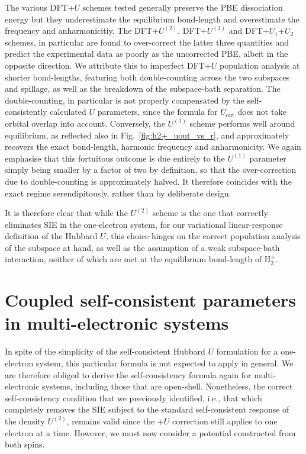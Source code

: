 %
The various DFT+$U$ schemes tested
generally preserve the PBE dissociation energy 
but they underestimate the equilibrium bond-length 
and overestimate the frequency and anharmonicitiy.
%
The DFT+$U^{(2)}$,  DFT+$U^{(3)}$ 
and DFT+$U_1$+$U_2$ schemes, in particular 
are found to over-correct the latter three quantities 
and predict the experimental data as 
poorly as the uncorrected PBE, 
albeit in the opposite direction.
%
We attribute this to  imperfect
DFT+$U$ population analysis at shorter bond-lengths,
featuring both  double-counting across the two
subspaces and spillage, 
as well as the breakdown of the subspace-bath separation.
%
The double-counting, in particular is 
not properly compensated by the 
self-consistently calculated  $U$ parameters, 
since the formula for $U_\textrm{out}$ 
does not take orbital overlap into account.
%
Conversely, 
the $U^{(1)}$ scheme performs well around equilibrium, 
as reflected also in Fig.~\ref{fig:h2+_uout_vs_r}, 
and approximately recovers the exact 
bond-length, harmonic frequency and anharmonicity.
%
We again emphasise that this fortuitous outcome 
is due entirely to  the $U^{(1)}$ parameter 
simply being smaller by a factor of two by definition, 
so that the over-correction due to double-counting
is approximately halved.
% 
It therefore coincides with the exact regime serendipitously, 
rather than by deliberate design.


It is therefore clear that while 
the $U^{(2)}$ scheme is the one that correctly  
eliminates SIE in the one-electron system, 
for our variational linear-response 
definition of the Hubbard $U$,
this choice hinges on the correct population 
analysis of the subspace at hand, 
as well as the assumption of a 
weak subspace-bath interaction, 
neither of which are met 
at the equilibrium bond-length of H$_2^+$.



\section[Coupled self-consistent parameters in multi-electronic systems]{Coupled self-consistent parameters in \break multi-electronic systems}

In spite of the simplicity 
of the self-consistent Hubbard $U$ formulation 
for a one-electron system, 
this particular formula is not expected to apply in general.
%
We are therefore obliged to derive 
the self-consistency formula again 
for multi-electronic systems, 
including those that are open-shell.
%
Nonetheless, 
the correct self-consistency condition that we previously identified, 
i.e., that which completely removes the SIE 
subject to the standard self-consistent response of the density $U^{(2)}$, 
remains valid since the +$U$ correction still applies to one electron at a time.
% 
However, we must now consider a potential constructed from both spins.
%

